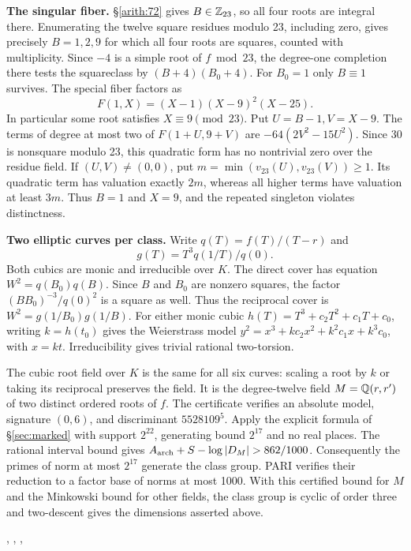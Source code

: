 \textbf{The singular fiber.} \S\ref{arith:72} gives \(B\in\mathbb Z_{23}\),
so all four roots are integral there. Enumerating the twelve square
residues modulo 23, including zero, gives precisely \(B=1,2,9\)
for which all four roots are squares, counted with multiplicity.
Since \(-4\) is a simple root of \(f\bmod23\), the degree-one
completion there tests the squareclass by \((B+4)(B_0+4)\).
For \(B_0=1\) only \(B\equiv1\) survives. The special fiber factors as
\[F(1,X)=(X-1)(X-9)^2(X-25).\]
In particular some root satisfies \(X\equiv9\pmod{23}\).
Put \(U=B-1, V=X-9\). The terms of degree at most two of
\(F(1+U,9+V)\) are \(-64(2V^2-15U^2)\).
Since 30 is nonsquare modulo 23, this quadratic form has no
nontrivial zero over the residue field. If \((U,V)\ne(0,0)\),
put \(m=\min(v_{23}(U),v_{23}(V))\ge1\). Its quadratic term has
valuation exactly \(2m\), whereas all higher terms have valuation
at least \(3m\). Thus \(B=1\) and \(X=9\), and the repeated
singleton violates distinctness.

\textbf{Two elliptic curves per class.} Write \(q(T)=f(T)/(T-r)\) and
\[g(T)=T^3q(1/T)/q(0).\]
Both cubics are monic and irreducible over \(K\). The direct
cover has equation \(W^2=q(B_0)q(B)\). Since \(B\) and \(B_0\)
are nonzero squares, the factor \((B B_0)^{-3}/q(0)^2\) is a
square as well. Thus the reciprocal cover is
\(W^2=g(1/B_0)g(1/B)\). For either monic cubic
\(h(T)=T^3+c_2T^2+c_1T+c_0\), writing \(k=h(t_0)\) gives
the Weierstrass model \(y^2=x^3+kc_2x^2+k^2c_1x+k^3c_0\),
with \(x=kt\). Irreducibility gives trivial rational two-torsion.

The cubic root field over \(K\) is the same for all six curves:
scaling a root by \(k\) or taking its reciprocal preserves the
field. It is the degree-twelve field \(M=\mathbb Q(r,r')\)
of two distinct ordered roots of \(f\). The certificate verifies
an absolute model, signature \((0,6)\), and discriminant
\(5528109^5\). Apply the explicit formula of \S\ref{sec:marked} with support
\(2^{22}\), generating bound \(2^{17}\) and no real places.
The rational interval bound gives
\(A_{\rm arch}+S-\log|D_M|>862/1000\).
Consequently the primes of norm at most \(2^{17}\) generate the
class group. PARI verifies their reduction to a factor base of
norms at most 1000. With this certified bound for \(M\) and the
Minkowski bound for other fields, the class group is cyclic of
order three and two-descent gives the dimensions asserted above.

,
,
,

